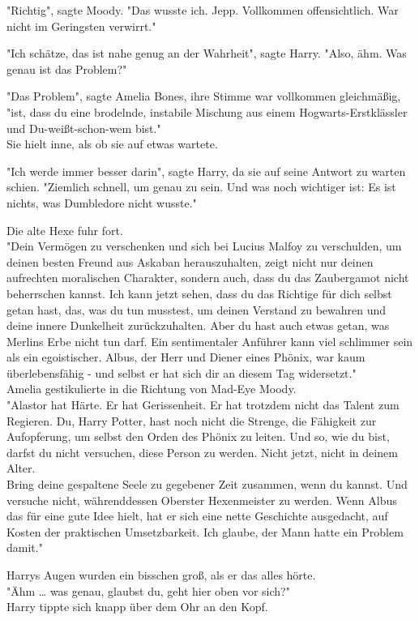 {"Richtig", sagte Moody. "Das wusste ich. Jepp. Vollkommen offensichtlich. War nicht im Geringsten verwirrt."

"Ich schätze, das ist nahe genug an der Wahrheit", sagte Harry. "Also, ähm. Was genau ist das Problem?"

"Das Problem", sagte Amelia Bones, ihre Stimme war vollkommen gleichmäßig, "ist, dass du eine brodelnde, instabile Mischung aus einem Hogwarts-Erstklässler und Du-weißt-schon-wem bist."\\ Sie hielt inne, als ob sie auf etwas wartete.

"Ich werde immer besser darin", sagte Harry, da sie auf seine Antwort zu warten schien. "Ziemlich schnell, um genau zu sein. Und was noch wichtiger ist: Es ist nichts, was Dumbledore nicht wusste."

Die alte Hexe fuhr fort.\\ "Dein Vermögen zu verschenken und sich bei Lucius Malfoy zu verschulden, um deinen besten Freund aus Askaban herauszuhalten, zeigt nicht nur deinen aufrechten moralischen Charakter, sondern auch, dass du das Zaubergamot nicht beherrschen kannst. Ich kann jetzt sehen, dass du das Richtige für dich selbst getan hast, das, was du tun musstest, um deinen Verstand zu bewahren und deine innere Dunkelheit zurückzuhalten. Aber du hast auch etwas getan, was Merlins Erbe nicht tun darf. Ein sentimentaler Anführer kann viel schlimmer sein als ein egoistischer. Albus, der Herr und Diener eines Phönix, war kaum überlebensfähig - und selbst er hat sich dir an diesem Tag widersetzt."\\ Amelia gestikulierte in die Richtung von Mad-Eye Moody.\\ "Alastor hat Härte. Er hat Gerissenheit. Er hat trotzdem nicht das Talent zum Regieren. Du, Harry Potter, hast noch nicht die Strenge, die Fähigkeit zur Aufopferung, um selbst den Orden des Phönix zu leiten. Und so, wie du bist, darfst du nicht versuchen, diese Person zu werden. Nicht jetzt, nicht in deinem Alter.\\ Bring deine gespaltene Seele zu gegebener Zeit zusammen, wenn du kannst. Und versuche nicht, währenddessen Oberster Hexenmeister zu werden. Wenn Albus das für eine gute Idee hielt, hat er sich eine nette Geschichte ausgedacht, auf Kosten der praktischen Umsetzbarkeit. Ich glaube, der Mann hatte ein Problem damit."

Harrys Augen wurden ein bisschen groß, als er das alles hörte.\\ "Ähm … was genau, glaubst du, geht hier oben vor sich?"\\ Harry tippte sich knapp über dem Ohr an den Kopf.

}
